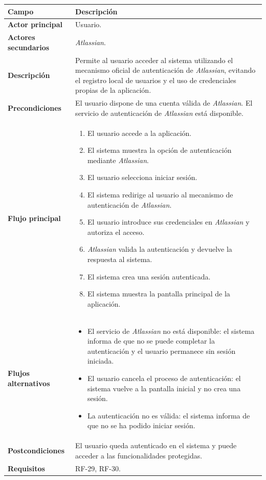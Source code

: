 {\renewcommand{\arraystretch}{1.25}\footnotesize
\begin{longtable}{p{3.2cm}p{10.2cm}}
\toprule
\textbf{Campo} & \textbf{Descripción} \\
\midrule
\textbf{Actor principal} & Usuario. \\
\textbf{Actores secundarios} & \textit{Atlassian}. \\
\textbf{Descripción} & Permite al usuario acceder al sistema utilizando el mecanismo oficial de autenticación de \textit{Atlassian}, evitando el registro local de usuarios y el uso de credenciales propias de la aplicación. \\
\textbf{Precondiciones} & El usuario dispone de una cuenta válida de \textit{Atlassian}. El servicio de autenticación de \textit{Atlassian} está disponible. \\
\textbf{Flujo principal} & \begin{minipage}[t]{10.2cm}\begin{enumerate}[noitemsep,leftmargin=*]
    \item El usuario accede a la aplicación.
    \item El sistema muestra la opción de autenticación mediante \textit{Atlassian}.
    \item El usuario selecciona iniciar sesión.
    \item El sistema redirige al usuario al mecanismo de autenticación de \textit{Atlassian}.
    \item El usuario introduce sus credenciales en \textit{Atlassian} y autoriza el acceso.
    \item \textit{Atlassian} valida la autenticación y devuelve la respuesta al sistema.
    \item El sistema crea una sesión autenticada.
    \item El sistema muestra la pantalla principal de la aplicación.
\end{enumerate}\end{minipage} \\
\textbf{Flujos alternativos} & \begin{minipage}[t]{10.2cm}\begin{itemize}[noitemsep,leftmargin=*]
    \item El servicio de \textit{Atlassian} no está disponible: el sistema informa de que no se puede completar la autenticación y el usuario permanece sin sesión iniciada.
    \item El usuario cancela el proceso de autenticación: el sistema vuelve a la pantalla inicial y no crea una sesión.
    \item La autenticación no es válida: el sistema informa de que no se ha podido iniciar sesión.
\end{itemize}\end{minipage} \\
\textbf{Postcondiciones} & El usuario queda autenticado en el sistema y puede acceder a las funcionalidades protegidas. \\
\textbf{Requisitos} & RF-29, RF-30. \\
\bottomrule
\end{longtable}
\vspace{0.45em}
}

